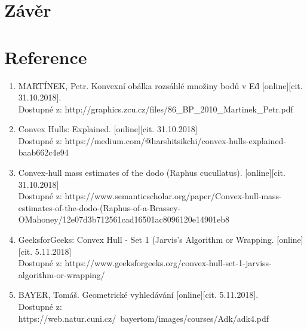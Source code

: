 \documentclass[a4paper, 12pt]{article}
\begin{document}
 
\clearpage
\section{Závěr}



\clearpage
\section{Reference}

\begin{enumerate}
\item  MARTÍNEK, Petr. Konvexní obálka rozsáhlé množiny bodů v E\^d [online][cit. 31.10.2018]. \\
Dostupné z: http://graphics.zcu.cz/files/86\_BP\_2010\_Martinek\_Petr.pdf  \\

\item Convex Hulls: Explained. [online][cit. 31.10.2018]\\
Dostupné z: https://medium.com/@harshitsikchi/convex-hulls-explained-baab662c4e94\\

\item Convex-hull mass estimates of the dodo (Raphus cucullatus). [online][cit. 31.10.2018]\\
Dostupné z: https://www.semanticscholar.org/paper/Convex-hull-mass-estimates-of-the-dodo-(Raphus-of-a-Brassey-O\'Mahoney/12e07d3b712561cad16501ac8096120e14901eb8

\item GeeksforGeeks: Convex Hull - Set 1 (Jarvis's Algorithm or Wrapping. [online][cit. 5.11.2018]\\
Dostupné z: https://www.geeksforgeeks.org/convex-hull-set-1-jarviss-algorithm-or-wrapping/

\item  BAYER, Tomáš. Geometrické vyhledávání [online][cit. 5.11.2018]. \\
Dostupné z: https://web.natur.cuni.cz/~bayertom/images/courses/Adk/adk4.pdf  \\



\end{enumerate}
\end{document}
